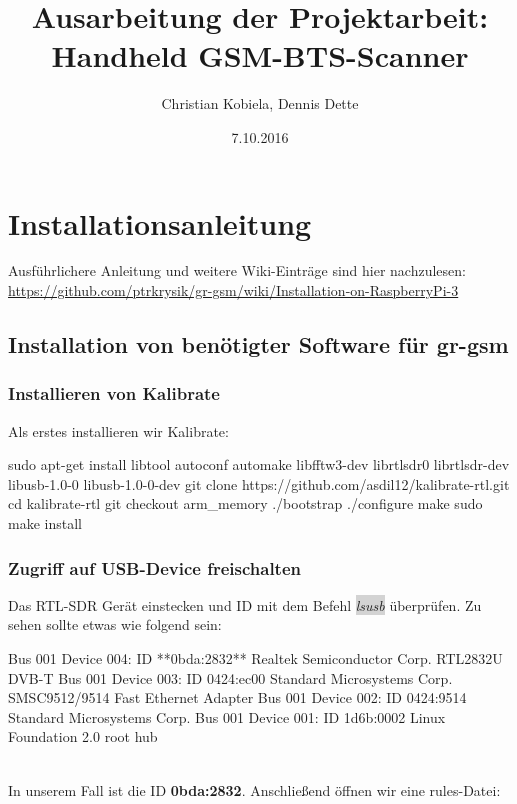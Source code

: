 \documentclass{scrreprt}
\title{Ausarbeitung der Projektarbeit:\\Handheld GSM-BTS-Scanner}
\author{Christian Kobiela, Dennis Dette}
\date{7.10.2016}
\begin{document}
\maketitle
\tableofcontents
\chapter{Installationsanleitung}

Ausführlichere Anleitung und weitere Wiki-Einträge sind hier nachzulesen:\\
\url{https://github.com/ptrkrysik/gr-gsm/wiki/Installation-on-RaspberryPi-3}


\section{Installation von benötigter Software für gr-gsm}

\subsection{Installieren von Kalibrate}

Als erstes installieren wir Kalibrate:

\begin{code}[	numbers=left,stepnumber=1]
sudo apt-get install libtool autoconf automake libfftw3-dev librtlsdr0 librtlsdr-dev libusb-1.0-0 libusb-1.0-0-dev
git clone https://github.com/asdil12/kalibrate-rtl.git
cd kalibrate-rtl
git checkout arm_memory
./bootstrap
./configure
make
sudo make install 
\end{code}

\subsection{Zugriff auf USB-Device freischalten}

Das RTL-SDR Gerät einstecken und ID mit dem Befehl \colorbox{lightgray}{\emph{lsusb}} überprüfen. Zu sehen sollte etwas wie folgend sein:

\begin{code}
Bus 001 Device 004: ID **0bda:2832** Realtek Semiconductor Corp. RTL2832U DVB-T
Bus 001 Device 003: ID 0424:ec00 Standard Microsystems Corp. SMSC9512/9514 Fast Ethernet Adapter
Bus 001 Device 002: ID 0424:9514 Standard Microsystems Corp.
Bus 001 Device 001: ID 1d6b:0002 Linux Foundation 2.0 root hub
\end{code}

\noindent{}\\In unserem Fall ist die ID \textbf{0bda:2832}. Anschließend öffnen wir eine rules-Datei:
\end{document}
